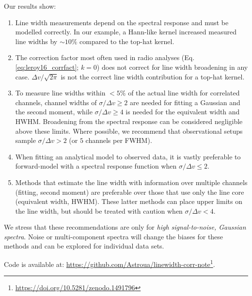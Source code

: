 \documentclass{rnaastex}
\begin{document}
Our results show:
\begin{enumerate}
    \item Line width measurements depend on the spectral response and must be modelled correctly. In our example, a Hann-like kernel increased measured line widths by $\sim10\%$ compared to the top-hat kernel.
    \item The correction factor most often used in radio analyses (Eq. \ref{eq:leroy16_corrfact}; $k=0$) does not correct for line width broadening in any case.  $\Delta v / \sqrt{2\pi}$ is not the correct line width contribution for a top-hat kernel.
    \item To measure line widths within $<5\%$ of the actual line width for correlated channels, channel widths of $\sigma / \Delta v \geq 2$ are needed for fitting a Gaussian and the second moment, while $\sigma / \Delta v \geq 4$ is needed for the equivalent width and HWHM. Broadening from the spectral response can be considered negligible above these limits.  Where possible, we recommend that observational setups sample $\sigma / \Delta v > 2$ (or $5$ channels per FWHM).
    \item When fitting an analytical model to observed data, it is vastly preferable to forward-model with a spectral response function when $\sigma / \Delta v \leq 2$.
    \item Methods that estimate the line width with information over multiple channels (fitting, second moment) are preferable over those that use only the line core (equivalent width, HWHM). These latter methods can place upper limits on the line width, but should be treated with caution when $\sigma / \Delta v <4$.
\end{enumerate}

We stress that these recommendations are only for {\it high signal-to-noise, Gaussian spectra}. Noise or multi-component spectra will change the biases for these methods and can be explored for individual data sets.

Code is available at: \url{https://github.com/Astroua/linewidth-corr-note}\footnote{\url{https://doi.org/10.5281/zenodo.1491796}}.
\end{document}
